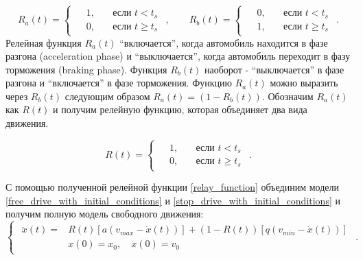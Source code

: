 \documentclass[12pt, a4paper]{extarticle}
\numberwithin{equation}{section}
\numberwithin{figure}{section}
\begin{document}
\begin{equation*} 
R_{a}(t)=
\begin{cases}
\begin{split}
&1, \quad&\text{если } t<t_{s} \\
&0, \quad&\text{если } t\geq t_{s}
\end{split}
\end{cases},
\qquad
R_{b}(t)=
\begin{cases}
\begin{split}
&0, \quad&\text{если } t<t_{s} \\
&1, \quad&\text{если } t\geq t_{s}
\end{split}
\end{cases}.
\end{equation*}
Релейная функция $R_{a}(t)$ ``включается'', когда автомобиль находится в фазе разгона (acceleration phase) и ``выключается'', когда автомобиль переходит в фазу торможения (braking phase). Функция $R_{b}(t)$ наоборот - ``выключается'' в фазе разгона и ``включается'' в фазе торможения. Функцию $R_{a}(t)$ можно выразить через $R_{b}(t)$ следующим образом $R_{a}(t) = (1-R_{b}(t))$. Обозначим $R_{a}(t)$ как $R(t)$ и получим релейную функцию, которая объединяет два вида движения.

\begin{equation} \label{relay_function}
R(t)=
\begin{cases}
\begin{split}
&1, \quad&\text{если } t<t_{s} \\
&0, \quad&\text{если } t\geq t_{s}
\end{split}
\end{cases}.
\end{equation}

С помощью полученной релейной функции \eqref{relay_function} объединим модели \eqref{free_drive_with_initial_conditions} и  \eqref{stop_drive_with_initial_conditions} и получим полную модель свободного движения:
\begin{equation} \label{free_drive_model}
\begin{cases}
\begin{split}
\ddot{x}(t) = &R(t) \left[ a\left(v_{max}-\dot{x}(t) \right)\right] + (1-R(t)) \left[ q\left( v_{min} - \dot{x}(t)\right) \right]  \\
&x(0)=x_0, \quad \dot{x}(0)=v_{0}
\end{split}
\end{cases}.
\end{equation}
\end{document}
